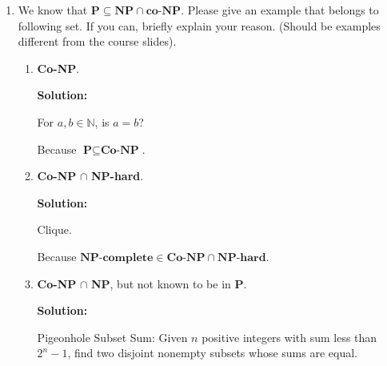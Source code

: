\documentclass[12pt,a4paper]{article}
\theoremstyle{definition}
\numberwithin{equation}{section}
\numberwithin{figure}{section}
\begin{document}
\begin{enumerate}
  \item We know that $\textbf{P} \subseteq \textbf{NP} \cap \textbf{co-NP}$. Please give an example that belongs to following set. If you can, briefly explain your reason. (Should be examples different from the course slides).
  \begin{enumerate}
    \item \textbf{Co-NP}.
    
    \textbf{Solution:}
    
    For $a,b \in \mathbb{N}$, is $a = b$?
    
Because $\textbf{P} \subseteq \textbf{Co-NP}$.
        
    \item \textbf{Co-NP} $\cap$ \textbf{NP-hard}.
    
    \textbf{Solution:}
    
    Clique.
    
    Because $\textbf{NP-complete} \in \textbf{Co-NP} \cap \textbf{NP-hard}$.
    
    
    
    \item \textbf{Co-NP} $\cap$ \textbf{NP}, but not known to be in \textbf{P}.
    
    \textbf{Solution:}
    
     Pigeonhole Subset Sum: Given $n$ positive integers with sum less than $2^n-1$, find two disjoint nonempty subsets whose sums are equal. 
     
     
  \end{enumerate}
\end{enumerate}
\end{document}
